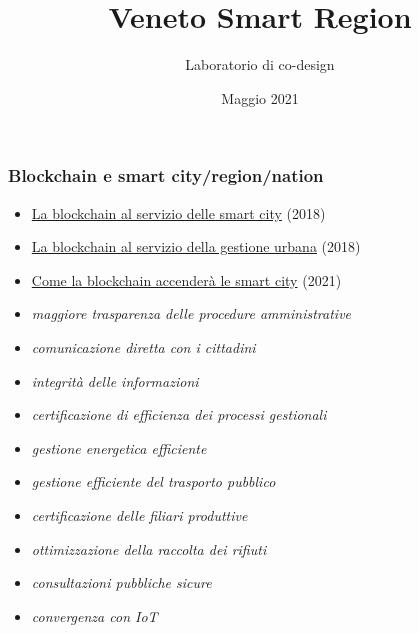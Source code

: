 \documentclass[11pt]{beamer}  %
\subtitle{Laboratorio di co-design}
\title{Veneto Smart Region}
\institute{Universit\`a di Verona}
\date{Maggio 2021}
\begin{document}
\begin{frame}
  \titlepage
\end{frame}

\begin{frame}\frametitle{Blockchain e smart city/region/nation}

  \begin{itemize}
  \item \href{https://www.am.pictet/it/blog/articoli/tecnologia-e-innovazione/la-blockchain-al-servizio-delle-smart-city}{La blockchain al servizio delle smart city} (2018)
  \item \href{https://www.iberdrola.com/innovation/blockchain-for-smart-cities-urban-management}{La blockchain al servizio della gestione urbana} (2018)
  \item \href{https://www.weforum.org/agenda/2021/04/how-blockchain-can-empower-smart-cities-gtgs21}{Come la blockchain accender\`a le smart city} (2021)
  \end{itemize}

  \bigskip  
  \begin{itemize}
  \item \emph{maggiore trasparenza delle procedure amministrative}
  \item \emph{comunicazione diretta con i cittadini}
  \item \emph{integrit\`a delle informazioni}
  \item \emph{certificazione di efficienza dei processi gestionali}
  \item \emph{gestione energetica efficiente}
  \item \emph{gestione efficiente del trasporto pubblico}
  \item \emph{certificazione delle filiari produttive}
  \item \emph{ottimizzazione della raccolta dei rifiuti}
  \item \emph{consultazioni pubbliche sicure}
  \item \emph{convergenza con IoT}
  \end{itemize}

\end{frame}
\end{document}
